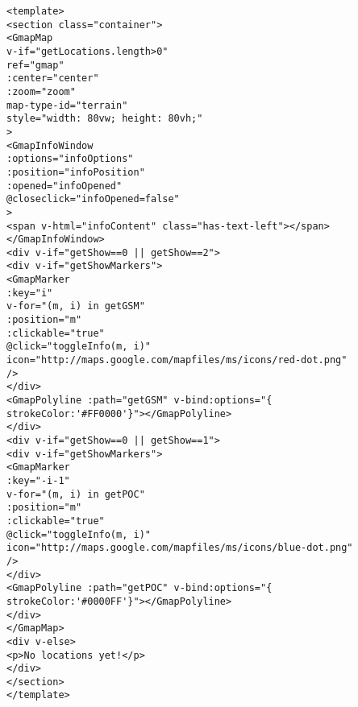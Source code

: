 \begin{lstlisting}
<template>
<section class="container">
<GmapMap
v-if="getLocations.length>0"
ref="gmap"
:center="center"
:zoom="zoom"
map-type-id="terrain"
style="width: 80vw; height: 80vh;"
>
<GmapInfoWindow
:options="infoOptions"
:position="infoPosition"
:opened="infoOpened"
@closeclick="infoOpened=false"
>
<span v-html="infoContent" class="has-text-left"></span>
</GmapInfoWindow>
<div v-if="getShow==0 || getShow==2">
<div v-if="getShowMarkers">
<GmapMarker
:key="i"
v-for="(m, i) in getGSM"
:position="m"
:clickable="true"
@click="toggleInfo(m, i)"
icon="http://maps.google.com/mapfiles/ms/icons/red-dot.png"
/>
</div>
<GmapPolyline :path="getGSM" v-bind:options="{ strokeColor:'#FF0000'}"></GmapPolyline>
</div>
<div v-if="getShow==0 || getShow==1">
<div v-if="getShowMarkers">
<GmapMarker
:key="-i-1"
v-for="(m, i) in getPOC"
:position="m"
:clickable="true"
@click="toggleInfo(m, i)"
icon="http://maps.google.com/mapfiles/ms/icons/blue-dot.png"
/>
</div>
<GmapPolyline :path="getPOC" v-bind:options="{ strokeColor:'#0000FF'}"></GmapPolyline>
</div>
</GmapMap>
<div v-else>
<p>No locations yet!</p>
</div>
</section>
</template>


\end{lstlisting}
